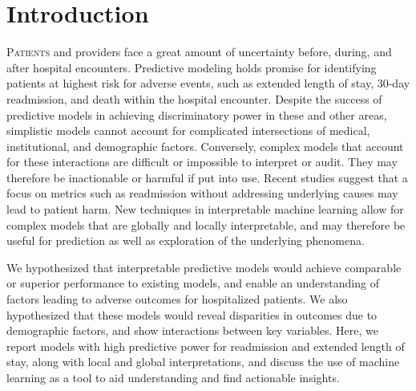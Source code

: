 \twocolumn
\section{Introduction}
\sloppy
\lettrine[lines=3,lraise=0.05,nindent=0pt]{\textcolor{NEJMGreyText}{P}}{atients} and providers
face a great amount of uncertainty before, during, and after hospital encounters.\@
Predictive modeling holds promise for identifying patients at highest risk for adverse events, %
such as extended length of stay, 30-day readmission, and death within the hospital encounter.\@
Despite the success of predictive models in achieving discriminatory power in these and other areas, %
simplistic models cannot account for complicated intersections of medical, %
institutional, and demographic factors. Conversely, %
complex models that account for these interactions are difficult or impossible to interpret or audit.\@
They may therefore be inactionable or harmful if put into use.\@
Recent studies suggest that a focus on metrics such as readmission without addressing
underlying causes may lead to patient harm.\supercite{Wadhera2018} \@ 
New techniques in interpretable machine learning allow for %
complex models that are globally and locally interpretable, and may %
therefore be useful for prediction as well as exploration of the underlying phenomena.\@

We hypothesized that interpretable predictive models would achieve comparable or superior performance to 
existing models, and enable an understanding of factors leading to adverse outcomes for hospitalized patients.\@
We also hypothesized that these models would reveal disparities in outcomes due to demographic factors,
and show interactions between key variables. Here, we report models with high predictive power for readmission and
extended length of stay, along with local and global interpretations, and discuss the use of 
machine learning as a tool to aid understanding and find actionable insights.